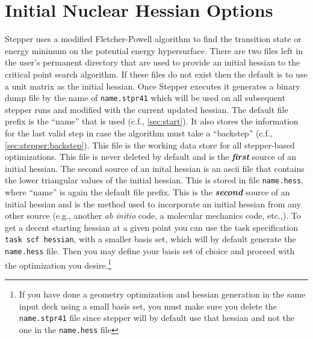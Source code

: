 \section{Initial Nuclear Hessian Options}
Stepper uses a modified Fletcher-Powell algorithm to find the
transition state or energy minimum on the potential energy
hypersurface.  There are two files left in the user's permanent
directory that are used to provide an initial hessian to the critical
point search algorithm.  If these files do not exist then the default
is to use a unit matrix as the initial hessian.  Once Stepper executes
it generates a binary dump file by the name of \verb+name.stpr41+
which will be used on all subsequent stepper runs and modified with
the current updated hessian.  The default file prefix is the ``name''
that is used (c.f., \ref{sec:start}). It also stores the information
for the last valid step in case the algorithm must take a ``backstep''
(c.f., \ref{sec:stepper:backstep}).  This file is the working data
store for all stepper-based optimizations.  This file is never deleted
by default and is the {\bf\it first} source of an initial hessian.
The second source of an inital hessian is an ascii file that contains
the lower triangular values of the initial hessian.  This is stored in
file \verb+name.hess+, where ``name'' is again the default file
prefix.  This is the {\bf\it second} source of an initial hessian and
is the method used to incorporate an initial hessian from any other
source (e.g., another {\it ab initio} code, a molecular mechanics
code, etc.,).  To get a decent starting hessian at a given point you
can use the task specification \verb+task scf hessian+, with a smaller
basis set, which will by default generate the \verb+name.hess+ file.
Then you may define your basis set of choice and proceed with the
optimization you desire.\footnote{If you have done a geometry
optimization and hessian generation in the same input deck using a
small basis set, you must make sure you delete the \verb+name.stpr41+
file since stepper will by default use that hessian and not the one in
the \verb+name.hess+ file}

